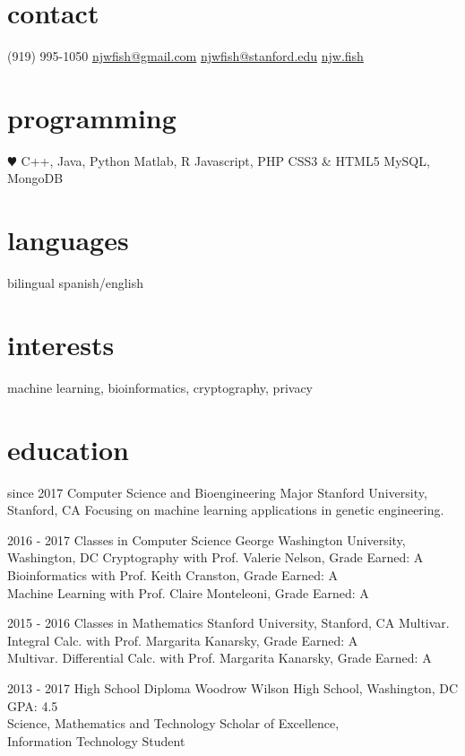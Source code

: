 \documentclass[]{friggeri-cv}
\begin{document}
\thispagestyle{empty}
       {}


\begin{aside}
  \section{contact}
    (919) 995-1050
    \href{mailto:njwfish@gmail.com}{njwfish@gmail.com}
    \href{mailto:njwfish@stanford.edu}{njwfish@stanford.edu}
    \href{http://njw.fish}{njw.fish}
  \section{programming}
    {\color{red} $\varheartsuit$} C++, Java, Python
    Matlab, R
    Javascript, PHP
    CSS3 \& HTML5
    MySQL, MongoDB
  \section{languages}
    bilingual spanish/english
\end{aside}

\section{interests}

machine learning, bioinformatics, cryptography, privacy

\section{education}

\begin{entrylist}
  \entry
    {since 2017}
    {Computer Science and Bioengineering Major}
    {Stanford University, Stanford, CA}
    {Focusing on machine learning applications in genetic engineering.}

  \entry
    {2016 - 2017}
    {Classes in Computer Science}
    {George Washington University, Washington, DC}
    {Cryptography with Prof. Valerie Nelson, Grade Earned: A\\
     Bioinformatics with Prof. Keith Cranston, Grade Earned: A\\
     Machine Learning with Prof. Claire Monteleoni, Grade Earned: A}
     
  \entry
    {2015 - 2016}
    {Classes in Mathematics}
    {Stanford University, Stanford, CA}
    {Multivar. Integral Calc. with Prof. Margarita Kanarsky, Grade Earned: A\\
     Multivar. Differential Calc. with Prof. Margarita Kanarsky, Grade Earned: A}
    
  \entry
    {2013 - 2017}
    {High School Diploma}
    {Woodrow Wilson High School, Washington, DC}
    {GPA: 4.5 \\
    Science, Mathematics and Technology Scholar of Excellence, \\Information Technology Student}

\end{entrylist}
\end{document}
